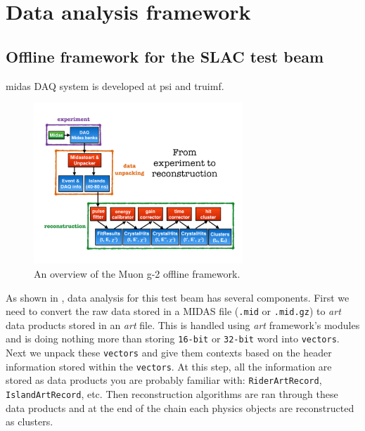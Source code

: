 \chapter{Data analysis framework}
\label{chap:analysisframework}

\section{Offline framework for the SLAC test beam}

\ac{midas} DAQ system is developed at \ac{psi} and \ac{truimf}.

\begin{figure}[htbp]
\centering
\includegraphics[width=0.7\textwidth]{pics/offline_exp_framework}
\caption{An overview of the Muon g-2 offline framework.}
\label{pic:exp_framework}
\end{figure}

As shown in , data analysis for this test beam has several components. First we need to convert the raw data stored in a MIDAS file (\verb+.mid+ or \verb+.mid.gz+) to \textit{art} data products stored in an \textit{art} file.
This is handled using \textit{art} framework's modules and is doing nothing more than storing \verb+16-bit+ or \verb+32-bit+ word into \verb+vectors+. Next we unpack these \verb+vectors+
and give them contexts based on the header information stored within the \verb+vectors+. At this step, all the information are stored as data products you are probably familiar with: \verb+RiderArtRecord+,
\verb+IslandArtRecord+, etc. Then reconstruction algorithms are ran through these data products and at the end of the chain each physics objects are reconstructed as clusters.

